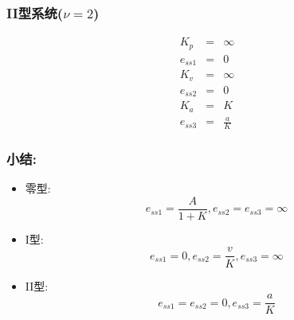 \documentclass{beamer}
\begin{document}
\begin{frame}
\frametitle{II型系统($\nu=2$)}
\label{sec-2-8}

\begin{eqnarray*}
K_p & = & \infty\\
e_{ss1} &=& 0 \\
K_v & = & \infty \\
e_{ss2} &=& 0 \\
K_a &=& K \\
e_{ss3} &=& \frac{a}{K}
\end{eqnarray*}
\end{frame}
\begin{frame}
\frametitle{小结:}
\label{sec-2-9}

\begin{itemize}
\item <2->零型:
     \[e_{ss1}=\frac{A}{1+K},e_{ss2}=e_{ss3}=\infty\]
\item <3->I型:
     \[e_{ss1}=0,e_{ss2}=\frac{v}{K},e_{ss3}=\infty\]
\item <4->II型:
     \[e_{ss1}=e_{ss2}=0,e_{ss3}=\frac{a}{K}\]
\end{itemize}
\end{frame}
\end{document}
